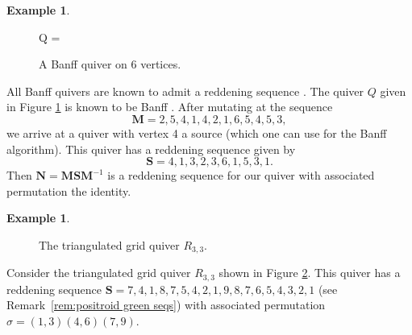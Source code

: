 \documentclass[11pt, letterpaper]{amsart}
\theoremstyle{definition}
\newtheorem{example}[theorem]{Example}
\numberwithin{equation}{section}
\begin{document}
\begin{example}
\label{eg:banff but tricky}
    \begin{figure}[ht]
        \centering
        Q =
        \caption{A Banff quiver on 6 vertices.}
        \label{fig:banff example}
    \end{figure}
    All Banff quivers are known to admit a reddening sequence \cite{MR4108215}.
    The quiver $Q$ given in Figure \ref{fig:banff example} is known to be Banff \cite{muller_locally_2013, ervin_answering_2024}.
    After mutating at the sequence 
    $$\mathbf{M} = 2,5,4,1,4,2,1,6,5,4,5,3,$$
    we arrive at a quiver with vertex 4 a source (which one can use for the Banff algorithm).
    This quiver has a reddening sequence given by
    $$\mathbf{S} = 4,1,3,2,3,6,1,5,3,1.$$
    Then $\mathbf{N} = \mathbf{MSM}^{-1}$ is a reddening sequence for our quiver with associated permutation the identity.
\end{example}


\begin{example}
\label{eg:grassmannian reddening}
\begin{figure}[ht]
    \centering
    \caption{The triangulated grid quiver $R_{3,3}$.}
    \label{fig:triang grid 3 3}
\end{figure}
Consider the triangulated grid quiver $R_{3,3}$ shown in Figure \ref{fig:triang grid 3 3}.
This quiver has a reddening sequence $\mathbf S = 7, 4, 1, 8, 7, 5, 4, 2, 1, 9, 8, 7, 6, 5, 4, 3, 2, 1$ \cite{MR3452273} (see Remark~\ref{rem:positroid green seqs}) with associated permutation $\sigma = (1,3) (4,6) (7,9)$.
\end{example}
\end{document}
